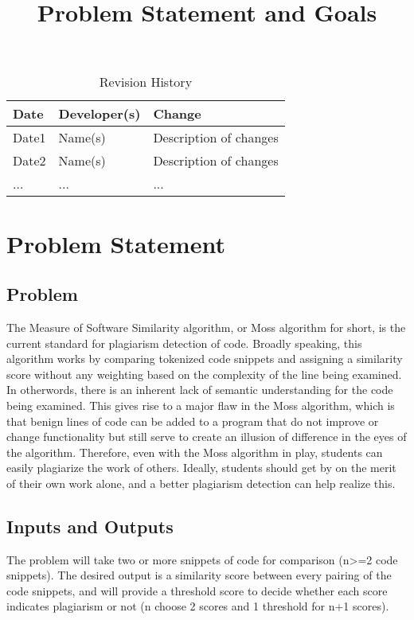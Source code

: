 \documentclass{article}
\title{Problem Statement and Goals\\\progname}
\author{\authname}
\date{}
\begin{document}
\maketitle

\begin{table}[hp]
\caption{Revision History} \label{TblRevisionHistory}
\begin{tabularx}{\textwidth}{llX}
\toprule
\textbf{Date} & \textbf{Developer(s)} & \textbf{Change}\\
\midrule
Date1 & Name(s) & Description of changes\\
Date2 & Name(s) & Description of changes\\
... & ... & ...\\
\bottomrule
\end{tabularx}
\end{table}

\section{Problem Statement}



\subsection{Problem}
The Measure of Software Similarity algorithm, or Moss algorithm for short, is the current standard for plagiarism detection of code. Broadly speaking, this algorithm works by comparing tokenized code snippets and assigning a similarity score without any weighting based on the complexity of the line being examined. In otherwords, there is an inherent lack of semantic understanding for the code being examined. This gives rise to a major flaw in the Moss algorithm, which is that benign lines of code can be added to a program that do not improve or change functionality but still serve to create an illusion of difference in the eyes of the algorithm. Therefore, even with the Moss algorithm in play, students can easily plagiarize the work of others. Ideally, students should get by on the merit of their own work alone, and a better plagiarism detection can help realize this.

\subsection{Inputs and Outputs}
The problem will take two or more snippets of code for comparison (n>=2 code snippets). The desired output is a similarity score between every pairing of the code snippets, and will provide a threshold score to decide whether each score indicates plagiarism or not (n choose 2 scores and 1 threshold for n+1 scores). 
\end{document}
